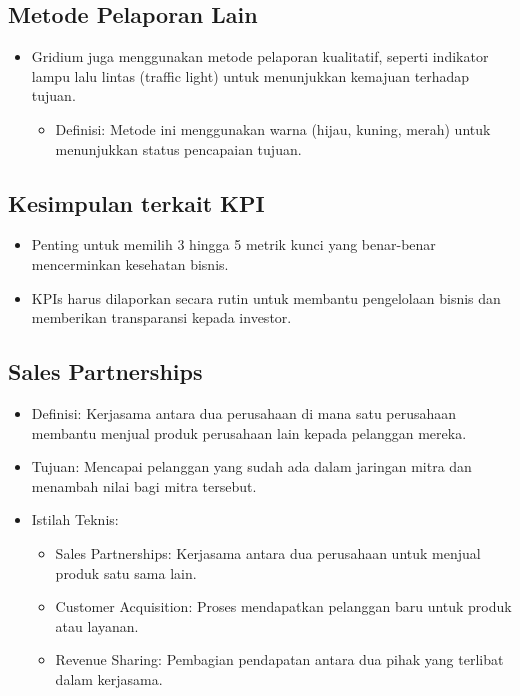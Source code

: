 \documentclass{article}
\begin{document}
\subsection{Metode Pelaporan Lain}
\begin{itemize}
    \item Gridium juga menggunakan metode pelaporan kualitatif, seperti indikator lampu lalu lintas (traffic light) untuk menunjukkan kemajuan terhadap tujuan.
          \begin{itemize}
              \item Definisi: Metode ini menggunakan warna (hijau, kuning, merah) untuk menunjukkan status pencapaian tujuan.
          \end{itemize}
\end{itemize}

\subsection{Kesimpulan terkait KPI}
\begin{itemize}
    \item Penting untuk memilih 3 hingga 5 metrik kunci yang benar-benar mencerminkan kesehatan bisnis.
    \item KPIs harus dilaporkan secara rutin untuk membantu pengelolaan bisnis dan memberikan transparansi kepada investor.
\end{itemize}

\subsection{Sales Partnerships}
\begin{itemize}
    \item Definisi: Kerjasama antara dua perusahaan di mana satu perusahaan membantu menjual produk perusahaan lain kepada pelanggan mereka.
    \item Tujuan: Mencapai pelanggan yang sudah ada dalam jaringan mitra dan menambah nilai bagi mitra tersebut.
    \item Istilah Teknis:
          \begin{itemize}
              \item Sales Partnerships: Kerjasama antara dua perusahaan untuk menjual produk satu sama lain.
              \item Customer Acquisition: Proses mendapatkan pelanggan baru untuk produk atau layanan.
              \item Revenue Sharing: Pembagian pendapatan antara dua pihak yang terlibat dalam kerjasama.
          \end{itemize}
\end{itemize}
\end{document}
